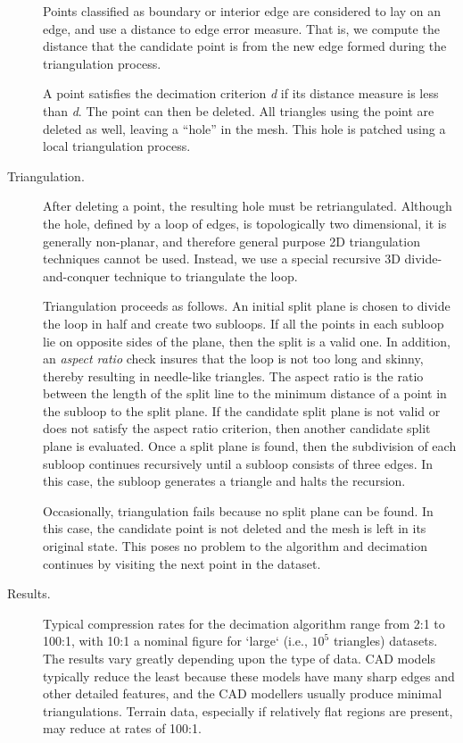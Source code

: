 \begin{description}
Points classified as boundary or interior edge are considered to lay on an edge, and use a distance to edge error measure. That is, we compute the distance that the candidate point is from the new edge formed during the triangulation process.

A point satisfies the decimation criterion \emph{d} if its distance measure is less than \emph{d}. The point can then be deleted. All triangles using the point are deleted as well, leaving a ``hole'' in the mesh. This hole is patched using a local triangulation process.

\item[Triangulation.] \label{subsec:decimation.triangulation} After deleting a point, the resulting hole must be retriangulated. Although the hole, defined by a loop of edges, is topologically two dimensional, it is generally non-planar, and therefore general purpose 2D triangulation techniques cannot be used. Instead, we use a special recursive 3D divide-and-conquer technique to triangulate the loop.

Triangulation proceeds as follows. An initial split plane is chosen to divide the loop in half and create two subloops. If all the points in each subloop lie on opposite sides of the plane, then the split is a valid one. In addition, an \emph{aspect ratio} check insures that the loop is not too long and skinny, thereby resulting in needle-like triangles. The aspect ratio is the ratio between the length of the split line to the minimum distance of a point in the subloop to the split plane. If the candidate split plane is not valid or does not satisfy the aspect ratio criterion, then another candidate split plane is evaluated. Once a split plane is found, then the subdivision of each subloop continues recursively until a subloop consists of three edges. In this case, the subloop generates a triangle and halts the recursion.

Occasionally, triangulation fails because no split plane can be found. In this case, the candidate point is not deleted and the mesh is left in its original state. This poses no problem to the algorithm and decimation continues by visiting the next point in the dataset.

\item[Results.] Typical compression rates for the decimation algorithm range from 2:1 to 100:1, with 10:1 a nominal figure for `large` (i.e., $10^5$ triangles) datasets. The results vary greatly depending upon the type of data. CAD models typically reduce the least because these models have many sharp  edges and other detailed features, and the CAD modellers usually produce minimal triangulations. Terrain data, especially if relatively flat regions are present, may reduce at rates of 100:1.


\end{description}
